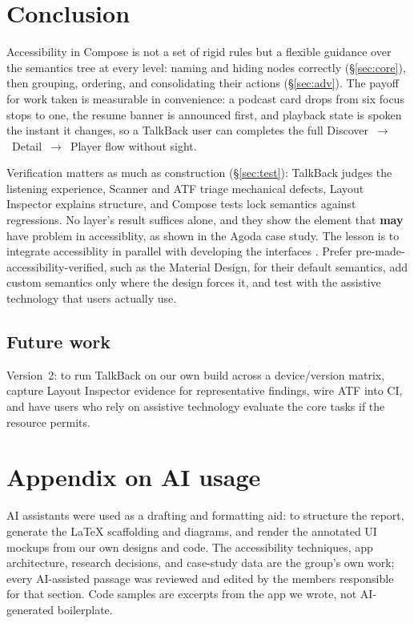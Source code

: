 \section{Conclusion}

Accessibility in Compose is not a set of rigid rules but a flexible guidance over the semantics tree at every level: naming
and hiding nodes correctly (§\ref{sec:core}), then grouping, ordering, and consolidating their
actions (§\ref{sec:adv}). The payoff for work taken is measurable in convenience: a podcast card drops from six focus stops to
one, the resume banner is announced first, and playback state is spoken the instant it changes, so
a TalkBack user can completes the full Discover~$\rightarrow$~Detail~$\rightarrow$~Player flow without sight.

Verification matters as much as construction (§\ref{sec:test}): TalkBack judges the listening
experience, Scanner and ATF triage mechanical defects, Layout Inspector explains structure, and
Compose tests lock semantics against regressions. No layer's result suffices alone, and they show the element that \textbf{may} have problem in accessiblity, as shown in the Agoda case study.
The lesson is to integrate accessiblity in parallel with developing the interfaces . Prefer pre-made-accessibility-verified, such as the Material Design, for
their default semantics, add custom semantics only where the design forces it, and test with the
assistive technology that users actually use.

\subsection*{Future work}

Version~2: to run TalkBack on our own build across a device/version matrix, capture Layout Inspector
evidence for representative findings, wire ATF into CI, and  have users
who rely on assistive technology evaluate the core tasks if the resource permits.

\section*{Appendix on AI usage}

AI assistants were used as a drafting and formatting aid: to structure the report, generate the
LaTeX scaffolding and diagrams, and render the annotated UI mockups from our own designs and code.
The accessibility techniques, app architecture, research decisions, and case-study data are the
group's own work; every AI-assisted passage was reviewed and edited by the members responsible for
that section. Code samples are excerpts from the app we wrote, not AI-generated boilerplate.
